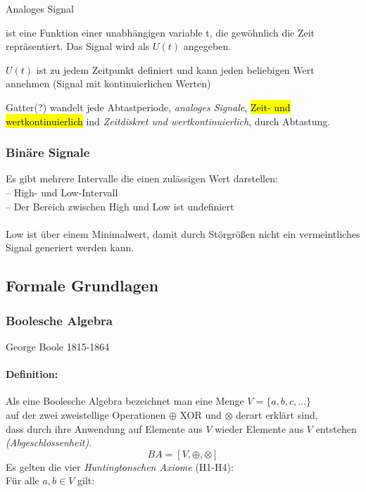 \documentclass[a4paper]{scrartcl}
\begin{document}
				\begin{labeling}{Analoges Signal}
					\item[Ein Signal] ist eine Funktion einer unabhängigen variable t, die gewöhnlich die Zeit repräsentiert. Das Signal wird als \(U(t)\) angegeben.
					\item[Analoges Signal] \( U(t) \) ist zu jedem Zeitpunkt definiert und kann jeden beliebigen Wert annehmen (Signal mit kontinuierlichen Werten)
				\end{labeling}
				
				Gatter(?) wandelt jede Abtastperiode, \emph{analoges Signale}, \hl{Zeit- und wertkontinuierlich} ind \emph{Zeitdiskret und wertkontinuierlich}, durch Abtastung.\\
			
			\subsubsection{Binäre Signale}
				Es gibt mehrere Intervalle die einen zulässigen Wert darstellen:\\
				-- High- und Low-Intervall\\
				-- Der Bereich zwischen High und Low ist undefiniert\\
				\\
				Low ist über einem Minimalwert, damit durch Störgrößen nicht ein vermeintliches Signal generiert werden kann.
				
		\subsection{Formale Grundlagen}
			\subsubsection{Boolesche Algebra}
				George Boole 1815-1864\\
				
				\paragraph{Definition:}
				Als eine Boolesche Algebra bezeichnet man eine Menge \( V = \{ a,b,c, \dots \} \)\\
				auf der zwei zweistellige Operationen \(  \oplus \) XOR und \( \otimes \) derart erklärt sind,\\
				dass durch ihre Anwendung auf Elemente aus \( V \) wieder Elemente aus \( V \) entstehen \emph{(Abgeschlossenheit)}.\\
				\[ BA = [V, \oplus , \otimes ] \]
				Es gelten die vier \emph{Huntingtonschen Axiome} (H1-H4):\\
					Für alle \( a,b \in V \) gilt:\\
\end{document}
